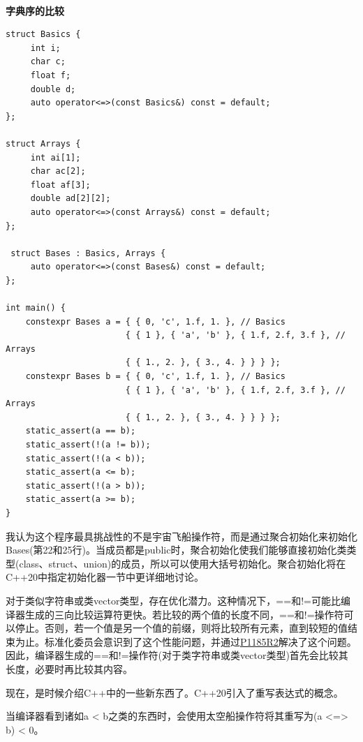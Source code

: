 \hspace*{\fill} \\ %
\noindent
\textbf{字典序的比较}
\begin{lstlisting}[style=styleCXX]
struct Basics {
	 int i;
	 char c;
	 float f;
	 double d;
	 auto operator<=>(const Basics&) const = default;
};

struct Arrays {
	 int ai[1];
	 char ac[2];
	 float af[3];
	 double ad[2][2];
	 auto operator<=>(const Arrays&) const = default;
};

 struct Bases : Basics, Arrays {
	 auto operator<=>(const Bases&) const = default;
};

int main() {
	constexpr Bases a = { { 0, 'c', 1.f, 1. }, // Basics
	 					{ { 1 }, { 'a', 'b' }, { 1.f, 2.f, 3.f }, // Arrays
						{ { 1., 2. }, { 3., 4. } } } };
	constexpr Bases b = { { 0, 'c', 1.f, 1. }, // Basics
	 					{ { 1 }, { 'a', 'b' }, { 1.f, 2.f, 3.f }, // Arrays
		 				{ { 1., 2. }, { 3., 4. } } } };
	static_assert(a == b);
	static_assert(!(a != b));
	static_assert(!(a < b));
	static_assert(a <= b);
	static_assert(!(a > b));
	static_assert(a >= b);
}
\end{lstlisting}

我认为这个程序最具挑战性的不是宇宙飞船操作符，而是通过聚合初始化来初始化Bases(第22和25行)。当成员都是public时，聚合初始化使我们能够直接初始化类类型(class、struct、union)的成员，所以可以使用大括号初始化。聚合初始化将在C++20中指定初始化器一节中更详细地讨论。

\begin{tcolorbox}[breakable,enhanced jigsaw,colback=blue!5!white,colframe=blue!75!black,title={优化的==和!=操作符}]

对于类似字符串或类vector类型，存在优化潜力。这种情况下，==和!=可能比编译器生成的三向比较运算符更快。若比较的两个值的长度不同，==和!=操作符可以停止。否则，若一个值是另一个值的前缀，则将比较所有元素，直到较短的值结束为止。标准化委员会意识到了这个性能问题，并通过\href{http://www.open-std.org/jtc1/sc22/wg21/docs/papers/2019/p1185r2.html}{P1185R2}解决了这个问题。因此，编译器生成的==和!=操作符(对于类字符串或类vector类型)首先会比较其长度，必要时再比较其内容。

\end{tcolorbox}

现在，是时候介绍C++中的一些新东西了。C++20引入了重写表达式的概念。


当编译器看到诸如a < b之类的东西时，会使用太空船操作符将其重写为(a <=> b) < 0。

